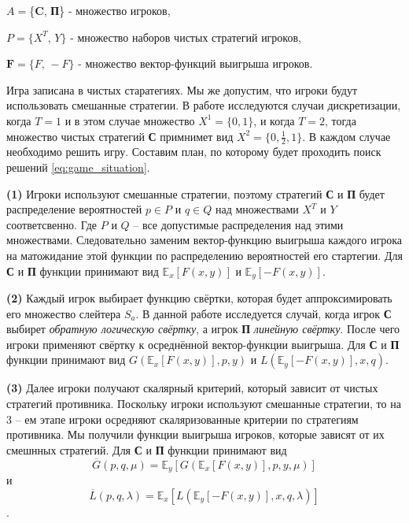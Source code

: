 	$ A = $\{\textbf{C}, \textbf{П}\} - множество игроков,

	$ P = \{X^T, \, Y\}$ - множество наборов чистых
	стратегий игроков,
	
	$ \textbf{F} = \{F, \, -F\}$ - множество вектор-функций выигрыша
	игроков.
	
Игра записана в чистых старатегиях. Мы же допустим, что игроки будут 
использовать смешанные стратегии. 
В работе исследуются случаи дискретизации, когда $T=1$ и в этом 
случае множество $X^1=\{0, 1\}$, и когда 
$T=2$, тогда множество чистых стратегий \textbf{С}
примнимет вид $X^2=\{0, \frac{1}{2} ,1\}$.
В каждом случае необходимо решить игру. Составим план, по которому
будет проходить поиск решений \eqref{eq:game_situation}.

\hspace{3mm}

\textbf{(1)} 
Игроки используют смешанные стратегии, поэтому стратегий \textbf{С} и
\textbf{П} будет распределение вероятностей $p \in P$ и 
$q \in Q$ над множествами $X^T$ и $Y$
соответсвенно. Где $P$ и $Q$ -- все допустимые
распределения над этими множествами.
Следовательно заменим вектор-функцию выигрыша каждого
игрока на матожидание этой функции по распределению вероятностей его
стартегии. Для \textbf{С} и \textbf{П} функции принимают вид 
$\mathbb{E}_x [F(x,y)]$ и $\mathbb{E}_y [-F(x,y)]$.

\hspace{3mm}

\textbf{(2)}
Каждый игрок выбирает функцию свёртки, которая будет аппроксимировать его
множество слейтера $S_a$. В данной работе исследуется случай, когда
игрок \textbf{С} выбирет \textit{обратную логическую свёртку}, 
а игрок \textbf{П} \textit{линейную свёртку}. После чего игроки 
применяют свёртку к осреднённой вектор-функции выигрыша.
Для \textbf{С} и \textbf{П} функции принимают вид 
$G(\mathbb{E}_x [F(x,y)], p, y)$ и $L(\mathbb{E}_y [-F(x,y)], x, q)$.

\hspace{3mm}

\textbf{(3)}
Далее игроки получают скалярный критерий, который зависит от 
чистых стратегий противника. Поскольку игроки используют смешанные стратегии,
то на 3 -- ем этапе игроки осредняют скаляризованные критерии по 
стратегиям противника. Мы получили функции выигрыша игроков, которые
зависят от их смешнных стратегий.
Для \textbf{С} и \textbf{П} функции принимают вид 
$$
	\overline G(p, q, \mu) =
	\mathbb{E}_y [G(\mathbb{E}_x [F(x,y)], p, y, \mu)]
$$ и $$
	\overline L(p, q, \lambda) = 
	\mathbb{E}_x [L(\mathbb{E}_y [-F(x,y)], x, q, \lambda)]
$$.

